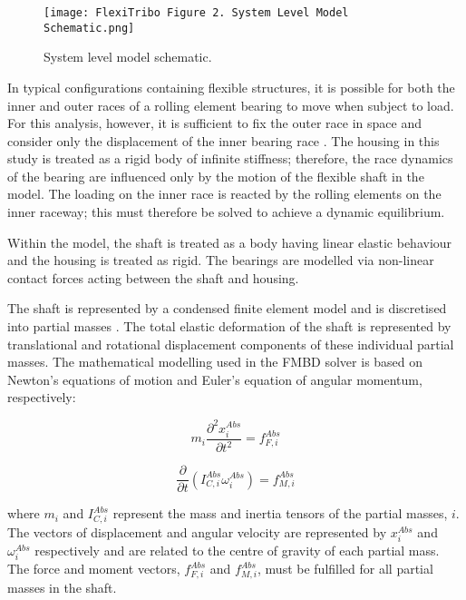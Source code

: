 \begin{figure}
	\centering  
	\texttt{[image: FlexiTribo Figure 2. System Level Model Schematic.png]}
	\caption{System level model schematic.}
	\label{System level model schematic}
\end{figure} 

In typical configurations containing flexible structures, it is possible for both the inner and outer races of a rolling element bearing to move when subject to load. For this analysis, however, it is sufficient to fix the outer race in space and consider only the displacement of the inner bearing race \cite{DeMul1989_2}. The housing in this study is treated as a rigid body of infinite stiffness; therefore, the race dynamics of the bearing are influenced only by the motion of the flexible shaft in the model. The loading on the inner race is reacted by the rolling elements on the inner raceway; this must therefore be solved to achieve a dynamic equilibrium.

Within the model, the shaft is treated as a body having linear elastic behaviour and the housing is treated as rigid. The bearings are modelled via non-linear contact forces acting between the shaft and housing.

The shaft is represented by a condensed finite element model and is discretised into partial masses \cite{Parikyan2001}. The total elastic deformation of the shaft is represented by translational and rotational displacement components of these individual partial masses. The mathematical modelling used in the FMBD solver is based on Newton’s equations of motion and Euler’s equation of angular momentum, respectively:

\begin{equation}\label{NewtonFMBD}
	m_i \frac{\partial^2 x_i^{A b s}}{\partial t^2}=f_{F, i}^{A b s}
\end{equation}

\begin{equation}\label{EulerFMBD}
	\frac{\partial}{\partial t}\left(I_{C, i}^{A b s} \omega_i^{A b s}\right)=f_{M, i}^{A b s}
\end{equation}

where $m_i$ and $I_{C, i}^{A b s}$ represent the mass and inertia tensors of the partial masses, $i$. The vectors of displacement and angular velocity are represented by $x_i^{A b s}$ and $\omega_i^{A b s}$ respectively and are related to the centre of gravity of each partial mass. The force and moment vectors, $f_{F, i}^{A b s}$ and $f_{M, i}^{A b s}$, must be fulfilled for all partial masses in the shaft.

